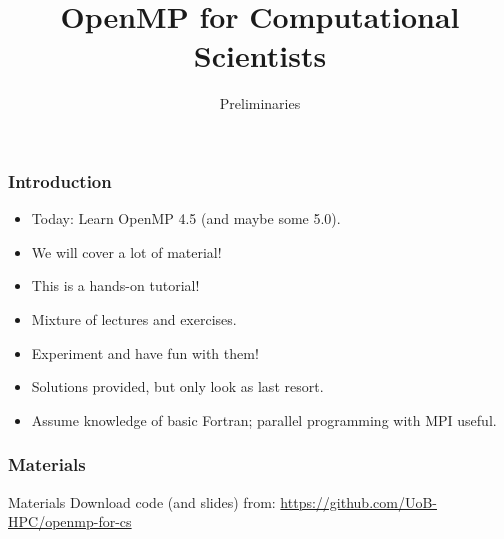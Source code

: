 \documentclass[aspectratio=169]{beamer}
\title{OpenMP for Computational Scientists}
\subtitle{Preliminaries}
\begin{document}
\frame{\titlepage}






\begin{frame}
\frametitle{Introduction}

\begin{itemize}
  \item Today: Learn OpenMP 4.5 (and maybe some 5.0).
  \item We will cover a lot of material!
  \item This is a hands-on tutorial!
  \item Mixture of lectures and exercises.
  \item Experiment and have fun with them!
  \item Solutions provided, but only look as last resort.
  \item Assume knowledge of basic Fortran; parallel programming with MPI useful.
\end{itemize}
\end{frame}


\begin{frame}
\frametitle{Materials}
\begin{block}{Materials}
Download code (and slides) from:
\url{https://github.com/UoB-HPC/openmp-for-cs}
\end{block}
\end{frame}
\end{document}
